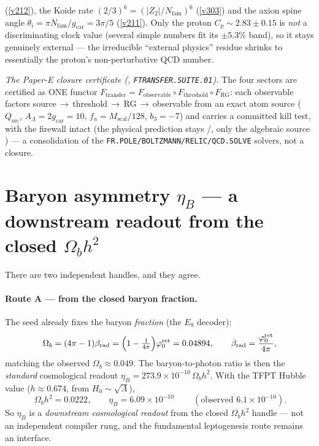 \documentclass[11pt,a4paper]{article}
\newcommand{\phiz}{\varphi_0^{\mathrm{ret}}}
\begin{document}
\begin{gapbox}
(\vref{v212}), the Koide rate $(2/3)^6=(|Z_2|/N_{\mathrm{fam}})^6$ (\vref{v303}) and the axion spine angle
$\theta_i=\pi N_{\mathrm{fam}}/g_{\mathrm{car}}=3\pi/5$ (\vref{v211}). Only the proton $C_p\sim2.83\pm0.15$ is \emph{not} a discriminating
clock value (several simple numbers fit its $\pm5.3\%$ band), so it stays genuinely external --- the irreducible
``external physics'' residue shrinks to essentially the proton's non-perturbative QCD number.
\par\smallskip\noindent\emph{The Paper-E closure certificate (, \texttt{FTRANSFER.SUITE.01}).}
The four sectors are certified as ONE functor $F_{\mathrm{transfer}}=F_{\mathrm{observable}}\circ F_{\mathrm{threshold}}\circ F_{\mathrm{RG}}$:
each observable factors source\,$\to$\,threshold\,$\to$\,RG\,$\to$\,observable from an exact atom source ($Q_{\mathrm{src}}$,
$A_\Lambda=2g_{\mathrm{car}}=10$, $f_a=M_{\mathrm{scal}}/128$, $b_3=-7$) and carries a committed kill test, with the firewall
intact (the physical prediction stays \mC/\mO, only the algebraic source \mE) --- a consolidation of the
\texttt{FR.POLE/BOLTZMANN/RELIC/QCD.SOLVE} solvers, not a closure.
\end{gapbox}

\section{Baryon asymmetry $\eta_B$ --- a downstream readout from the closed $\Omega_b h^2$}
There are two independent handles, and they agree.

\paragraph{Route A --- from the closed baryon fraction.} The seed already fixes the baryon
\emph{fraction} (the $E_8$ decoder):
\[
  \Omega_b=(4\pi-1)\beta_{\mathrm{rad}}=\Bigl(1-\tfrac1{4\pi}\Bigr)\phiz=0.04894 ,\qquad
  \beta_{\mathrm{rad}}=\frac{\phiz}{4\pi},
\]
matching the observed $\Omega_b\approx0.049$. The baryon-to-photon ratio is then the \emph{standard}
cosmological readout $\eta_B=273.9\times10^{-10}\,\Omega_b h^2$. With the TFPT Hubble value
($h\approx0.674$, from $H_0\sim\sqrt\Lambda$),
\[
  \boxed{\ \Omega_b h^2=0.0222,\qquad \eta_B=6.09\times10^{-10}\ }\qquad(\text{observed }6.1\times10^{-10}).
\]
So $\eta_B$ is a \emph{downstream cosmological readout} from the closed $\Omega_b h^2$ handle --- not an
independent compiler rung, and the fundamental leptogenesis route remains an interface.
\end{document}
